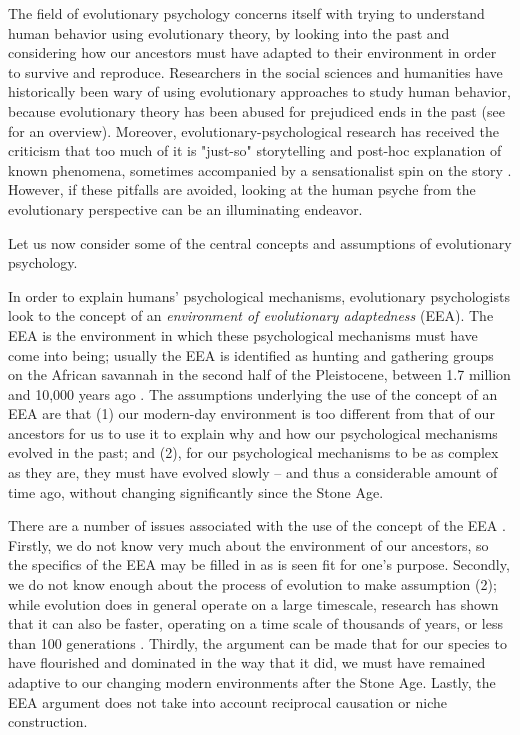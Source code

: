 The field of evolutionary psychology concerns itself with trying to understand human behavior using evolutionary theory, by looking into the past and considering how our ancestors must have adapted to their environment in order to survive and reproduce.
Researchers in the social sciences and humanities have historically been wary of using evolutionary approaches to study human behavior, because evolutionary theory has been abused for prejudiced ends in the past (see \citet[pp.~19--20]{LB02} for an overview). Moreover, evolutionary-psychological research has received the criticism that too much of it is "just-so" storytelling and post-hoc explanation of known phenomena, sometimes accompanied by a sensationalist spin on the story \citep{LB02}.
However, if these pitfalls are avoided, looking at the human psyche from the evolutionary perspective can be an illuminating endeavor.

Let us now consider some of the central concepts and assumptions of evolutionary psychology.

In order to explain humans' psychological mechanisms, evolutionary psychologists look to the concept of an \emph{environment of evolutionary adaptedness} (EEA). The EEA is the environment in which these psychological mechanisms must have come into being; usually the EEA is identified as hunting and gathering groups on the African savannah in the second half of the Pleistocene, between 1.7 million and 10,000 years ago \citep{LB02}.
The assumptions underlying the use of the concept of an EEA are that (1) our modern-day environment is too different from that of our ancestors for us to use it to explain why and how our psychological mechanisms evolved in the past; and (2), for our psychological mechanisms to be as complex as they are, they must have evolved slowly -- and thus a considerable amount of time ago, without changing significantly since the Stone Age.

There are a number of issues associated with the use of the concept of the EEA \citep{LB02}. Firstly, we do not know very much about the environment of our ancestors, so the specifics of the EEA may be filled in as is seen fit for one's purpose. Secondly, we do not know enough about the process of evolution to make assumption (2); while evolution does in general operate on a large timescale, research has shown that it can also be faster, operating on a time scale of thousands of years, or less than 100 generations \citep[pp.~190--191 and references therein]{LB02}. Thirdly, the argument can be made that for our species to have flourished and dominated in the way that it did, we must have remained adaptive to our changing modern environments after the Stone Age. Lastly, the EEA argument does not take into account reciprocal causation or niche construction.

